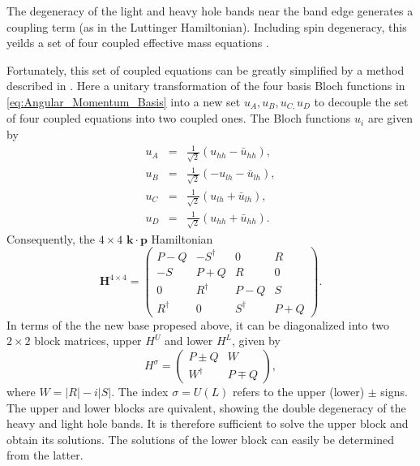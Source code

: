 The degeneracy of the light and heavy hole bands near the band edge
generates a coupling term (as in the Luttinger Hamiltonian). Including
spin degeneracy, this yeilds a set of four coupled effective mass
equations \citet{Broido1985,Andreani1987,Chuang1995}. 

Fortunately, this set of coupled equations can be greatly simplified
by a method described in \citet{Broido1985}. Here a unitary transformation
of the four basis Bloch functions in \ref{eq:Angular_Momentum_Basis}
into a new set $u_{A},u_{B},u_{C,}u_{D}$ to decouple the set of four
coupled equations into two coupled ones. The Bloch functions $u_{i}$
are given by\begin{eqnarray}
u_{A} & = & \frac{1}{\sqrt{2}}\left(u_{hh}-\bar{u}_{hh}\right),\\
u_{B} & = & \frac{1}{\sqrt{2}}\left(-u_{lh}-\bar{u}_{lh}\right),\\
u_{C} & = & \frac{1}{\sqrt{2}}\left(u_{lh}+\bar{u}_{lh}\right),\\
u_{D} & = & \frac{1}{\sqrt{2}}\left(u_{hh}+\bar{u}_{hh}\right).\end{eqnarray}
Consequently, the $4\times4$ $\mathbf{k}\cdot\mathbf{p}$ Hamiltonian
\begin{equation}
\mathbf{H}^{4\times4}=\left(\begin{array}{cccc}
P-Q & -S^{\dagger} & 0 & R\\
-S & P+Q & R & 0\\
0 & R^{\dagger} & P-Q & S\\
R^{\dagger} & 0 & S^{\dagger} & P+Q\end{array}\right).\end{equation}
In terms of the the new base propesed above, it can be diagonalized
into two $2\times2$ block matrices, upper $H^{U}$ and lower $H^{L}$,
given by\begin{equation}
H^{\sigma}=\left(\begin{array}{cc}
P\pm Q & W\\
W^{\dagger} & P\mp Q\end{array}\right),\label{eq:Block_2_2_H}\end{equation}
where $W=\left|R\right|-i\left|S\right|$. The index $\sigma=U(L)$
refers to the upper (lower) $\pm$ signs. The upper and lower blocks
are quivalent, showing the double degeneracy of the heavy and light
hole bands. It is therefore sufficient to solve the upper block and
obtain its solutions. The solutions of the lower block can easily
be determined from the latter.

